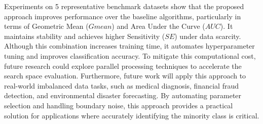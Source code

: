 \documentclass[pdflatex,sn-mathphys-num]{sn-jnl}%
\theoremstyle{thmstyleone}%
\theoremstyle{thmstyletwo}
\theoremstyle{thmstylethree}
\begin{document}
Experiments on 5 representative benchmark datasets show that the proposed approach improves performance over the baseline algorithms, particularly in terms of Geometric Mean ($Gmean$) and Area Under the Curve ($AUC$). It maintains stability and achieves higher Sensitivity ($SE$) under data scarcity. Although this combination increases training time, it automates hyperparameter tuning and improves classification accuracy. To mitigate this computational cost, future research could explore parallel processing techniques to accelerate the search space evaluation. Furthermore, future work will apply this approach to real-world imbalanced data tasks, such as medical diagnosis, financial fraud detection, and environmental disaster forecasting. By automating parameter selection and handling boundary noise, this approach provides a practical solution for applications where accurately identifying the minority class is critical.
\backmatter


%

\end{document}

